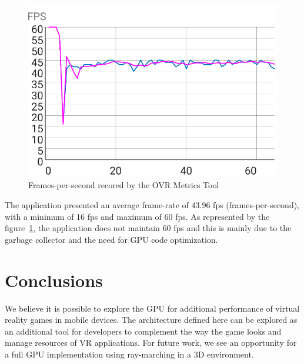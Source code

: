\documentclass[runningheads]{llncs}
\begin{document}
\begin{figure}[h]
\centering
\includegraphics[width=\textwidth]{src/hci2020-images/VRPerformance.png}
\caption{Frames-per-second recored by the OVR Metrics Tool}
\label{fig:VRPerformanceChart}
\end{figure}

The application presented an average frame-rate of 43.96 fps (frames-per-second), with a minimum of 16 fps and maximum of 60 fps. As represented by the figure~\ref{fig:VRPerformanceChart}, the application does not maintain 60 fps and this is mainly due to the garbage collector and the need for GPU code optimization.


\section{Conclusions}
We believe it is possible to explore the GPU for additional performance of virtual reality games in mobile devices. The architecture defined here can be explored as an additional tool for developers to complement the way the game looks and manage resources of VR applications. For future work, we see an opportunity for a full GPU implementation using ray-marching in a 3D environment.
%
%
%


\end{document}
